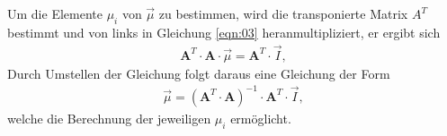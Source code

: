   \noindent Um die Elemente $\mu_i$ von $\vec{\mu}$ zu bestimmen, wird die
  transponierte Matrix $A^{T}$ bestimmt und von links in Gleichung \ref{eqn:03}
  heranmultipliziert, er ergibt sich
\begin{align}
  \textbf{A}^{T} \cdot \textbf{A} \cdot \vec{\mu} = \textbf{A}^{T} \cdot \vec{I},
  \label{eqn:04}
\end{align}
\noindent Durch Umstellen der Gleichung folgt daraus eine Gleichung der Form
\begin{align}
   \vec{\mu} = \left(\textbf{A}^{T} \cdot \textbf{A} \right)^{-1} \cdot \textbf{A}^{T} \cdot \vec{I},
  \label{eqn:05}
\end{align}
\noindent welche die Berechnung der jeweiligen $\mu_i$ ermöglicht.
